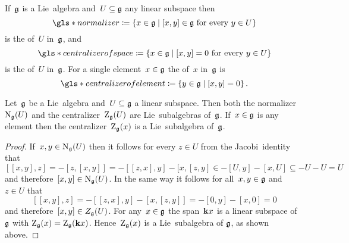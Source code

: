 \begin{definition}
  If~$\mathfrak{g}$ is a Lie~algebra and~$U \subseteq \mathfrak{g}$ any linear subspace then
  \[
    \gls*{normalizer}
    \defined
    \{
      x \in \glie
    \suchthat
      \text{$[x,y] \in \glie$ for every~$y \in U$}
    \}
  \]
  is the  of~$U$ in~$\mathfrak{g}$, and
  \[
    \gls*{centralizer of space}
    \defined
    \{
      x \in \glie
    \suchthat
      \text{$[x,y] = 0$ for every $y \in U$}
    \}
  \]
  is the  of~$U$ in~$\mathfrak{g}$.
  For a single element~$x \in \mathfrak{g}$ the  of~$x$ in~$\mathfrak{g}$ is
  \[
    \gls*{centralizer of element}
    \defined
    \{
      y \in \glie
    \suchthat
      [x,y] = 0
    \} \,.
  \]
\end{definition}


\begin{lemma}
 Let~$\mathfrak{g}$ be a Lie~algebra and~$U \subseteq \mathfrak{g}$ a linear subspace.
 Then both the normalizer~$\operatorname{N}_{\mathfrak{g}}(U)$ and the centralizer~$\operatorname{Z}_{\mathfrak{g}}(U)$ are Lie~subalgebras of~$\mathfrak{g}$.
 If~$x \in \mathfrak{g}$ is any element then the centralizer~$\operatorname{Z}_{\mathfrak{g}}(x)$ is a Lie~subalgebra of~$\mathfrak{g}$.
\end{lemma}


\begin{proof}
 If~$x, y \in \operatorname{N}_{\mathfrak{g}}(U)$ then it follows for every $z \in U$ from the Jacobi~identity that
 \[
  [[x,y], z]
  =
  - [z, [x,y]]
  =
  - [[z,x], y] - [x, [z,y]
  \in
  - [U, y] - [x, U]
  \subseteq
  - U - U
  =
  U
 \]
 and therefore~$[x,y] \in \operatorname{N}_{\mathfrak{g}}(U)$.
 In the same way it follows for all~$x, y \in \mathfrak{g}$ and~$z \in U$ that
 \[
  [[x,y], z]
  =
  - [[z,x], y] - [x, [z,y]]
  =
  - [0, y] - [x, 0]
  =
  0
 \]
 and therefore~$[x,y] \in Z_{\mathfrak{g}}(U)$.
 For any~$x \in \mathfrak{g}$ the span~$\mathbf{k} x$ is a linear subspace of~$\mathfrak{g}$ with $\operatorname{Z}_{\mathfrak{g}}(x) = \operatorname{Z}_{\mathfrak{g}}(\mathbf{k} x)$.
 Hence~$\operatorname{Z}_{\mathfrak{g}}(x)$ is a Lie~subalgebra of $\mathfrak{g}$, as shown above.
\end{proof}


